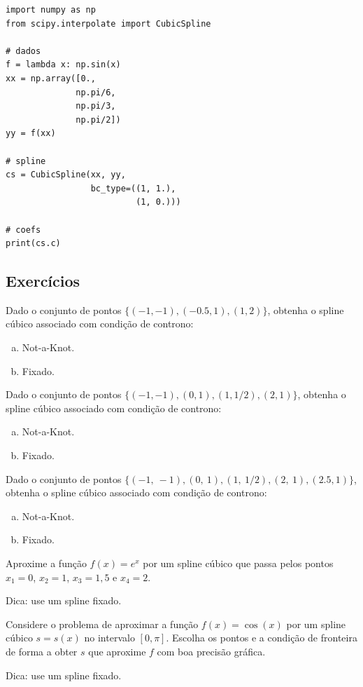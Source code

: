 \begin{ex}
\begin{lstlisting}
import numpy as np
from scipy.interpolate import CubicSpline

# dados
f = lambda x: np.sin(x)
xx = np.array([0.,
              np.pi/6,
              np.pi/3,
              np.pi/2])
yy = f(xx)

# spline
cs = CubicSpline(xx, yy,
                 bc_type=((1, 1.),
                          (1, 0.)))

# coefs
print(cs.c)
\end{lstlisting}
\end{ex}

\subsection{Exercícios}

\begin{exer}
  Dado o conjunto de pontos $\{(-1, -1), (-0.5, 1), (1, 2)\}$, obtenha o spline cúbico associado com condição de controno:
  \begin{enumerate}[a)]
  \item Not-a-Knot.
  \item Fixado.
  \end{enumerate}
\end{exer}

\begin{exer}
  Dado o conjunto de pontos $\{(-1, -1), (0, 1), (1, 1/2), (2, 1)\}$, obtenha o spline cúbico associado com condição de controno:
  \begin{enumerate}[a)]
  \item Not-a-Knot.
  \item Fixado.
  \end{enumerate}
\end{exer}

\begin{exer}
  Dado o conjunto de pontos $\{(-1,~-1), (0,~1), (1,~1/2), (2,~1), (2.5, 1)\}$, obtenha o spline cúbico associado com condição de controno:
  \begin{enumerate}[a)]
  \item Not-a-Knot.
  \item Fixado.
  \end{enumerate}
\end{exer}

\begin{exer}
  Aproxime a função $f(x)=e^{x}$ por um spline cúbico que passa pelos pontos $x_1=0$, $x_2=1$, $x_3=1,5$ e $x_4=2$.
\end{exer}
\begin{resp}
  Dica: use um spline fixado.
\end{resp}

\begin{exer}
  Considere o problema de aproximar a função $f(x) = \cos(x)$ por um spline cúbico $s = s(x)$ no intervalo $[0, \pi]$. Escolha os pontos e a condição de fronteira de forma a obter $s$ que aproxime $f$ com boa precisão gráfica.
\end{exer}
\begin{resp}
  Dica: use um spline fixado.
\end{resp}
